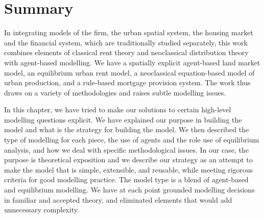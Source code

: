 






\section{Summary}\label{sec-summary}
In integrating models of the firm, the urban spatial system, the housing market and the financial system,  which are traditionally studied separately, this work combines elements of classical rent theory and neoclassical distribution theory with agent-based modelling. We have a spatially explicit agent-based land market model, an equilibrium urban rent model, a neoclassical equation-based model of urban production, and a rule-based mortgage provision system. The work thus draws on %
a variety of methodologies and raises subtle modelling issues. 

In this chapter, we have tried to make our solutions to certain high-level modelling questions explicit. We have explained our purpose in building the model and what is the strategy for building the model. We then described the type of modelling for each piece, the use of agents and the role use of equilibrium analysis, and how we deal with specific methodological issues. In our case, the purpose is \gls{theoretical exposition} and we describe our strategy as an attempt to make the model that is simple, extensible, and reusable, while meeting rigorous criteria for good modelling practice. The model type is a blend of agent-based and equilibrium modelling. %
We have at each point grounded modelling decisions in familiar and accepted theory, and eliminated elements that would add unnecessary complexity. 
